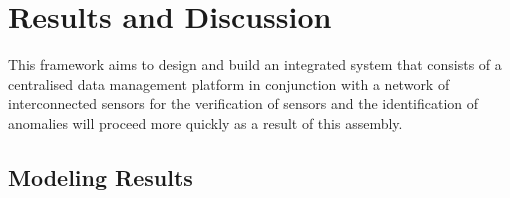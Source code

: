 \chapter{Results and Discussion}

This framework aims  to design and build an integrated system that consists of a centralised data management platform in conjunction with a network of interconnected sensors for the verification of sensors and the identification of anomalies will proceed more quickly as a result of this assembly.

\section{Modeling Results}
\lipsum[1-3]